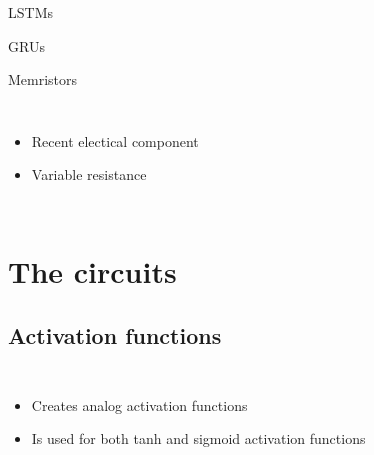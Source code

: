 \documentclass[14pt]{beamer}
\begin{document}
  \begin{frame}{\insertsection}{LSTMs}
    
  \end{frame}

  \begin{frame}{\insertsection}{GRUs}
    
  \end{frame}

  \begin{frame}{\insertsection}{Memristors}
    \begin{columns}
      
      \begin{itemize}
        \item Recent electical component
        \item Variable resistance
      \end{itemize}
    \end{columns}
  \end{frame}


  \section{The circuits}
  \subsection{Activation functions}
  \begin{frame}{\insertsection}{\insertsubsection}
    \begin{columns}
      
      \begin{itemize}
        \item Creates analog activation functions
        \item Is used for both tanh and sigmoid activation functions
      \end{itemize}
    \end{columns}
  \end{frame}

  \begin{frame}{\insertsection}{\insertsubsection}
    \begin{center}
      
    \end{center}
  \end{frame}
\end{document}
